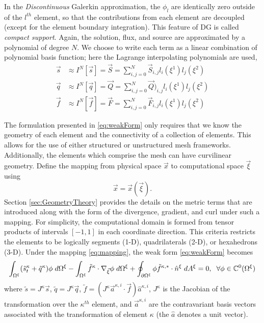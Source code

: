 \documentclass{softwaremanual}
\begin{document}
In the \textit{Discontinuous} Galerkin approximation, the $\phi_l$ are identically zero outside of the $l^{th}$ element, so that the contributions from each element are decoupled (except for the element boundary integration). This feature of DG is called \textit{compact support}. Again, the solution, flux, and source are approximated by a polynomial of degree $N$. We choose to write each term as a linear combination of polynomial basis function; here the Lagrange interpolating polynomials are used,
\begin{subequations}
    \begin{align}
    \vec{s} &\approx I^N[\vec{s}] = \vec{S} =  \sum_{i,j=0}^N \vec{S}_{i,j} l_i(\xi^1) l_j(\xi^2) \\
    \vec{q} &\approx I^N[\vec{q}]= \vec{Q} = \sum_{i,j=0}^N \vec{Q})_{i,j} l_i(\xi^1) l_j(\xi^2) \\
    \vec{f} &\approx I^N[\vec{f}] =\vec{F}= \sum_{i,j=0}^N \vec{F}_{i,j} l_i(\xi^1) l_j(\xi^2)
    \end{align}
 \end{subequations}


  The formulation presented in \eqref{eq:weakForm} only requires that we know the geometry of each element and the connectivity of a collection of elements. This allows for the use of either structured or unstructured mesh frameworks. Additionally, the elements which comprise the mesh can have curvilinear geometry. Define the mapping from physical space $\vec{x}$ to computational space $\vec{\xi}$ using
  \begin{equation}
  \vec{x} = \vec{x}(\vec{\xi}).\label{eq:mapping}
  \end{equation}
  Section \ref{sec:GeometryTheory} provides the details on the metric terms that are introduced along with the form of the divergence, gradient, and curl under such a mapping. For simplicity, the computational domain is formed from tensor products of intervals $[-1, 1]$ in each coordinate direction. This criteria restricts the elements to be logically segments (1-D), quadrilaterals (2-D), or hexahedrons (3-D). Under the mapping \eqref{eq:mapping}, the weak form \eqref{eq:weakForm} becomes
  \begin{equation}
  \int_{\Omega^\xi} (\tilde{s}^\kappa_t + \tilde{q}^\kappa) \phi \hspace{1mm} d\Omega^\xi  - \int_{\Omega^\xi} \tilde{f}^\kappa \cdot \nabla_{\vec{\xi}} \phi  \hspace{1mm} d\Omega^\xi + \oint_{\partial \Omega^\xi} \phi \tilde{f}^{\kappa,*}  \cdot \hat{n}^\xi \hspace{1mm} d A^\xi = 0, \hspace{2mm} \forall \phi \in \mathbb{C}^0(\Omega^\xi) \label{eq:mappedWeakForm}
  \end{equation}
  where $\tilde{s} = J^\kappa\vec{s}$, $\tilde{q} = J^\kappa\vec{q}$, $\tilde{f} = ( J^\kappa \vec{a}^{\kappa,i} \cdot \vec{f} ) \hat{a}^{\kappa,i}$, $J^{\kappa}$ is the Jacobian of the transformation over the $\kappa^{th}$ element, and $\vec{a}^{\kappa,i}$ are the contravariant basis vectors associated with the transformation of element $\kappa$ (the $\hat{a}$ denotes a unit vector).\\
  
\end{document}
